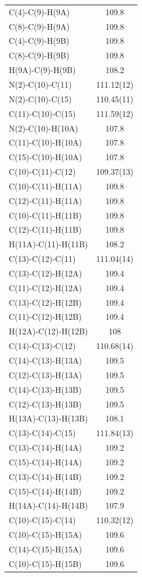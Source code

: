\begin{center}
{\begin{supertabular}{p{1.5in}c}
C(4)-C(9)-H(9A)&109.8\\
C(8)-C(9)-H(9A)&109.8\\
C(4)-C(9)-H(9B)&109.8\\
C(8)-C(9)-H(9B)&109.8\\
H(9A)-C(9)-H(9B)&108.2\\
N(2)-C(10)-C(11)&111.12(12)\\
N(2)-C(10)-C(15)&110.45(11)\\
C(11)-C(10)-C(15)&111.59(12)\\
N(2)-C(10)-H(10A)&107.8\\
C(11)-C(10)-H(10A)&107.8\\
C(15)-C(10)-H(10A)&107.8\\
C(10)-C(11)-C(12)&109.37(13)\\
C(10)-C(11)-H(11A)&109.8\\
C(12)-C(11)-H(11A)&109.8\\
C(10)-C(11)-H(11B)&109.8\\
C(12)-C(11)-H(11B)&109.8\\
H(11A)-C(11)-H(11B)&108.2\\
C(13)-C(12)-C(11)&111.04(14)\\
C(13)-C(12)-H(12A)&109.4\\
C(11)-C(12)-H(12A)&109.4\\
C(13)-C(12)-H(12B)&109.4\\
C(11)-C(12)-H(12B)&109.4\\
H(12A)-C(12)-H(12B)&108\\
C(14)-C(13)-C(12)&110.68(14)\\
C(14)-C(13)-H(13A)&109.5\\
C(12)-C(13)-H(13A)&109.5\\
C(14)-C(13)-H(13B)&109.5\\
C(12)-C(13)-H(13B)&109.5\\
H(13A)-C(13)-H(13B)&108.1\\
C(13)-C(14)-C(15)&111.84(13)\\
C(13)-C(14)-H(14A)&109.2\\
C(15)-C(14)-H(14A)&109.2\\
C(13)-C(14)-H(14B)&109.2\\
C(15)-C(14)-H(14B)&109.2\\
H(14A)-C(14)-H(14B)&107.9\\
C(10)-C(15)-C(14)&110.32(12)\\
C(10)-C(15)-H(15A)&109.6\\
C(14)-C(15)-H(15A)&109.6\\
C(10)-C(15)-H(15B)&109.6\\

\end{supertabular}}
\end{center}
